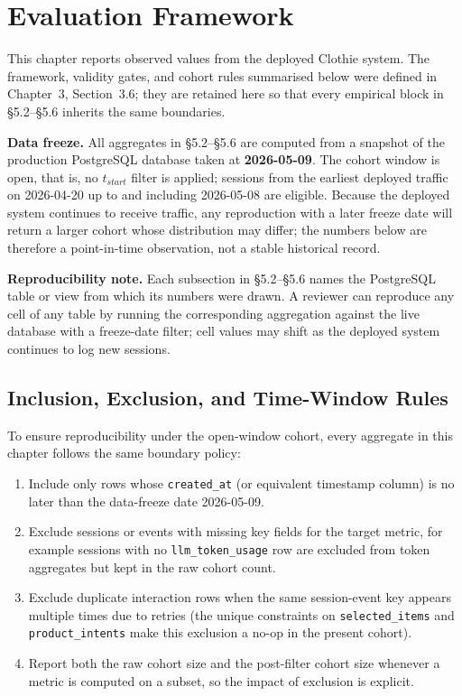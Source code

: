 
\section{Evaluation Framework}
\label{sec:evaluation_framework}

This chapter reports observed values from the deployed Clothie system. The framework, validity gates, and cohort rules summarised below were defined in Chapter~3, Section~3.6; they are retained here so that every empirical block in §5.2--§5.6 inherits the same boundaries.

\textbf{Data freeze.} All aggregates in §5.2--§5.6 are computed from a snapshot of the production PostgreSQL database taken at \textbf{2026-05-09}. The cohort window is open, that is, no $t_{start}$ filter is applied; sessions from the earliest deployed traffic on 2026-04-20 up to and including 2026-05-08 are eligible. Because the deployed system continues to receive traffic, any reproduction with a later freeze date will return a larger cohort whose distribution may differ; the numbers below are therefore a point-in-time observation, not a stable historical record.

\textbf{Reproducibility note.} Each subsection in §5.2--§5.6 names the PostgreSQL table or view from which its numbers were drawn. A reviewer can reproduce any cell of any table by running the corresponding aggregation against the live database with a freeze-date filter; cell values may shift as the deployed system continues to log new sessions.

\subsection{Inclusion, Exclusion, and Time-Window Rules}
\label{subsec:inclusion_exclusion_rules}

To ensure reproducibility under the open-window cohort, every aggregate in this chapter follows the same boundary policy:
\begin{enumerate}
    \item Include only rows whose \texttt{created\_at} (or equivalent timestamp column) is no later than the data-freeze date 2026-05-09.
    \item Exclude sessions or events with missing key fields for the target metric, for example sessions with no \texttt{llm\_token\_usage} row are excluded from token aggregates but kept in the raw cohort count.
    \item Exclude duplicate interaction rows when the same session-event key appears multiple times due to retries (the unique constraints on \texttt{selected\_items} and \texttt{product\_intents} make this exclusion a no-op in the present cohort).
    \item Report both the raw cohort size and the post-filter cohort size whenever a metric is computed on a subset, so the impact of exclusion is explicit.
\end{enumerate}

